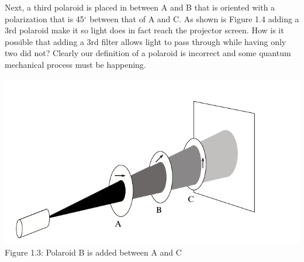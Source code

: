 \documentclass[12pt]{article}   	%
\begin{document}
Next, a third polaroid is placed in between A and B that is oriented with a polarization that is 45$^{\circ}$ between that of A and C. As shown is Figure 1.4 adding a 3rd polaroid make it so light does in fact reach the projector screen. How is it possible that adding a 3rd filter allows light to pass through while having only two did not? Clearly our definition of a polaroid is incorrect and some quantum mechanical process must be happening.\\ 
\begin{center}
    \includegraphics[scale=.5]{fig3.PNG}\label{Figure 1.3}\\Figure 1.3: Polaroid B is added between A and C
\end{center}
\end{document}
